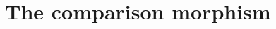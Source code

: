 \documentclass[11pt]{amsart}
\theoremstyle{plain}
\theoremstyle{definition}
\begin{document}
\section{The comparison morphism}
\end{document}

